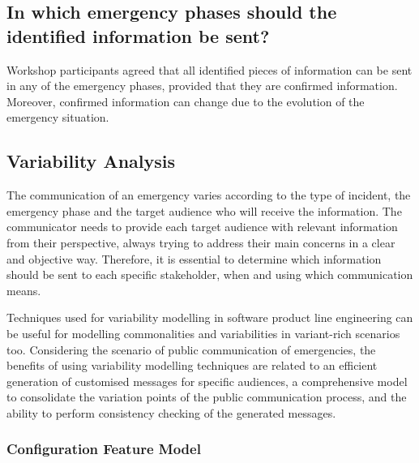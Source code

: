 \subsection*{In which emergency phases should the identified information be sent?}

Workshop participants agreed that all identified pieces of information can be sent in any of the emergency phases, provided that they are confirmed information. Moreover, confirmed information can change due to the evolution of the emergency situation. 

\subsection{Variability Analysis}


The communication of an emergency varies according to the type of incident, the emergency phase and the target audience who will receive the information. The communicator needs
to provide each target audience with relevant information from their perspective, always trying to address their main concerns in a clear and objective way\citep{panamericanhealthorganization2009}. Therefore, it is essential to determine which information should be sent to each specific stakeholder, when and using which communication means.

Techniques used for variability modelling in software product line engineering can be useful for modelling commonalities and variabilities in variant-rich scenarios too. Considering the scenario of public communication of emergencies, the benefits of using variability modelling techniques are related to an efficient generation of customised messages for specific audiences, a comprehensive model to consolidate the variation points of the public communication process, and the ability to perform consistency checking of the generated messages.


\subsubsection{Configuration Feature Model}\label{sec:configuration}


